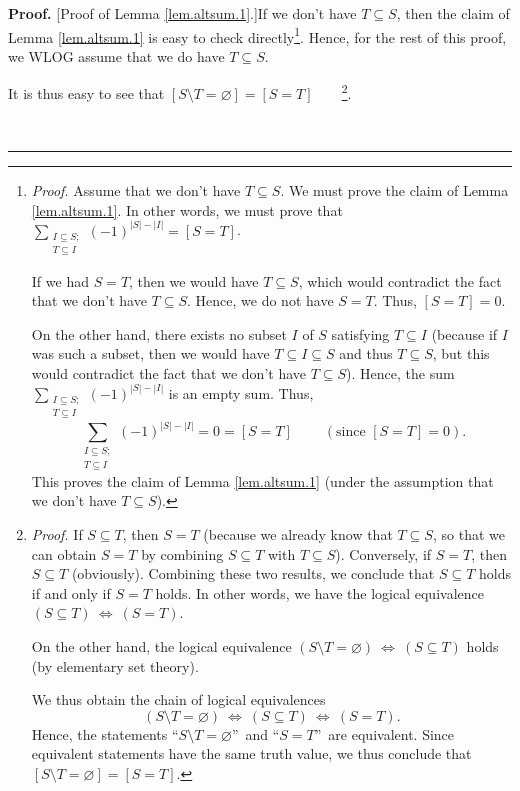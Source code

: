 \documentclass[numbers=enddot,12pt,final,onecolumn,notitlepage]{scrartcl}%
\theoremstyle{definition}
\newenvironment{proof}[1][Proof]{\noindent\textbf{#1.} }{\ \rule{0.5em}{0.5em}}
\let\sumnonlimits\sum
\renewcommand{\sum}{\sumnonlimits\limits}
\newenvironment{verlong}{}{}
\begin{document}
\begin{verlong}
\begin{proof}
[Proof of Lemma \ref{lem.altsum.1}.]If we don't have $T\subseteq S$, then the
claim of Lemma \ref{lem.altsum.1} is easy to check
directly\footnote{\textit{Proof.} Assume that we don't have $T\subseteq S$. We
must prove the claim of Lemma \ref{lem.altsum.1}. In other words, we must
prove that $\sum_{\substack{I\subseteq S;\\T\subseteq I}}\left(  -1\right)
^{\left\vert S\right\vert -\left\vert I\right\vert }=\left[  S=T\right]  $.
\par
If we had $S=T$, then we would have $T\subseteq S$, which would contradict the
fact that we don't have $T\subseteq S$. Hence, we do not have $S=T$. Thus,
$\left[  S=T\right]  =0$.
\par
On the other hand, there exists no subset $I$ of $S$ satisfying $T\subseteq I$
(because if $I$ was such a subset, then we would have $T\subseteq I\subseteq
S$ and thus $T\subseteq S$, but this would contradict the fact that we don't
have $T\subseteq S$). Hence, the sum $\sum_{\substack{I\subseteq
S;\\T\subseteq I}}\left(  -1\right)  ^{\left\vert S\right\vert -\left\vert
I\right\vert }$ is an empty sum. Thus,%
\[
\sum_{\substack{I\subseteq S;\\T\subseteq I}}\left(  -1\right)  ^{\left\vert
S\right\vert -\left\vert I\right\vert }=0=\left[  S=T\right]
\ \ \ \ \ \ \ \ \ \ \left(  \text{since }\left[  S=T\right]  =0\right)  .
\]
This proves the claim of Lemma \ref{lem.altsum.1} (under the assumption that
we don't have $T\subseteq S$).}. Hence, for the rest of this proof, we WLOG
assume that we do have $T\subseteq S$.

It is thus easy to see that $\left[  S\setminus T=\varnothing\right]  =\left[
S=T\right]  $\ \ \ \ \footnote{\textit{Proof.} If $S\subseteq T$, then $S=T$
(because we already know that $T\subseteq S$, so that we can obtain $S=T$ by
combining $S\subseteq T$ with $T\subseteq S$). Conversely, if $S=T$, then
$S\subseteq T$ (obviously). Combining these two results, we conclude that
$S\subseteq T$ holds if and only if $S=T$ holds. In other words, we have the
logical equivalence $\left(  S\subseteq T\right)  \ \Longleftrightarrow
\ \left(  S=T\right)  $.
\par
On the other hand, the logical equivalence $\left(  S\setminus T=\varnothing
\right)  \ \Longleftrightarrow\ \left(  S\subseteq T\right)  $ holds (by
elementary set theory).
\par
We thus obtain the chain of logical equivalences%
\[
\left(  S\setminus T=\varnothing\right)  \ \Longleftrightarrow\ \left(
S\subseteq T\right)  \ \Longleftrightarrow\ \left(  S=T\right)  .
\]
Hence, the statements \textquotedblleft$S\setminus T=\varnothing
$\textquotedblright\ and \textquotedblleft$S=T$\textquotedblright\ are
equivalent. Since equivalent statements have the same truth value, we thus
conclude that $\left[  S\setminus T=\varnothing\right]  =\left[  S=T\right]
$.}.


\end{proof}
\end{verlong}
\end{document}
